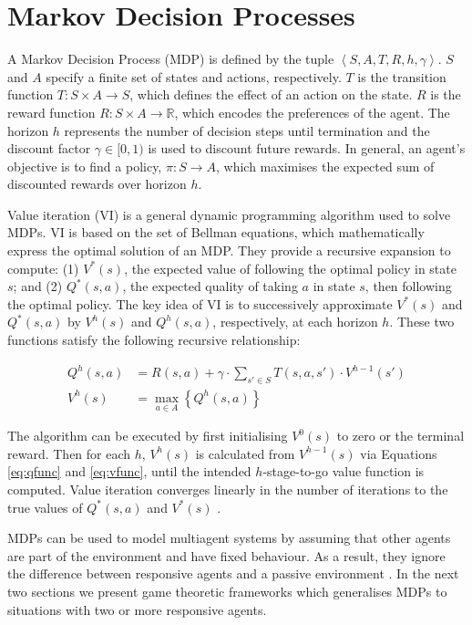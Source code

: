 \section{Markov Decision Processes}
\label{sec:mdp}

A Markov Decision Process (MDP) \cite{Howard_1960} is defined by the tuple
$ \left\langle S, A, T, R, h, \gamma \right\rangle $. $S$ and $A$ 
specify a finite set of states and actions, respectively.
$T$ is the transition function $T : S \times A \rightarrow S$, which 
defines the effect of an action on the state. $R$ is the
reward function $R : S \times A \rightarrow \mathbb{R}$, which 
encodes the preferences of the agent. The horizon $h$ represents the 
number of decision steps until termination and the discount factor $\gamma \in [0, 1)$
is used to discount future rewards. In general, an agent's objective is 
to find a policy, $\pi : S \rightarrow A$, which maximises the expected 
sum of discounted rewards over horizon $h$.

Value iteration (VI) \cite{Bellman_1957} is a general dynamic programming 
algorithm used to solve MDPs. VI is based on the set of Bellman equations,
which mathematically express the optimal solution of an MDP. They 
provide a recursive expansion to compute: (1) {\small $V^{*}(s)$}, the expected value of following
the optimal policy in state $s$; and (2) {\small $Q^{*}(s, a)$}, the expected
quality of taking $a$ in state $s$, then following the optimal policy. The
key idea of VI is to successively approximate {\small $V^{*}(s)$} and {\small $Q^{*}(s, a)$}
by {\small $V^{h}(s)$} and {\small $Q^{h}(s, a)$}, respectively, at each horizon $h$. These 
two functions satisfy the following recursive relationship:

{\small 
\abovedisplayskip=0pt
\belowdisplayskip=0pt
\begin{align}
  Q^{h}(s, a) &= R(s, a) + \gamma \cdot \sum_{s' \in S} T(s, a, s') \cdot V^{h-1}(s') \label{eq:qfunc}\\
  V^{h}(s) &= \max_{a \in A} \left\{ Q^{h}(s, a) \right\} \label{eq:vfunc}
\end{align}
}%

The algorithm can be executed by first initialising {\small $V^{0}(s)$}  to zero or the terminal reward. 
Then for each $h$, {\small $V^{h}(s)$} is calculated from {\small $V^{h-1}(s)$} via
Equations \eqref{eq:qfunc} and \eqref{eq:vfunc}, until the intended 
$h$-stage-to-go value function is computed. Value iteration converges 
linearly in the number of iterations to the true values of {\small $Q^{*}(s, a)$} and {\small $V^{*}(s)$}
\cite{Bertsekas_1987}.

MDPs can be used to model multiagent systems by assuming that other agents are 
part of the environment and have fixed behaviour. As a result, they ignore the difference 
between responsive agents and a passive environment \cite{Hu_ICML_1998}. In the next 
two sections we present game theoretic frameworks which generalises MDPs to situations 
with two or more responsive agents.